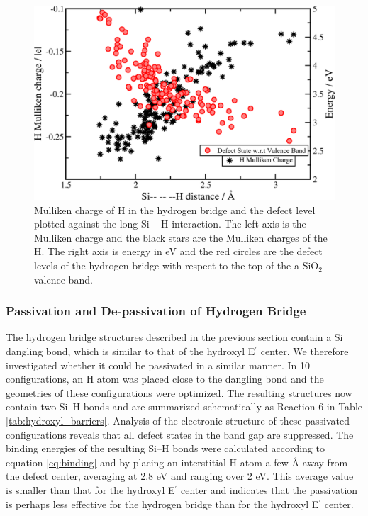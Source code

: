 \documentclass[aps,prb,reprint,superscriptaddress,showpacs]{revtex4-1}
\begin{document}
\begin{figure}[h!]
\includegraphics{hbridge_analysis.png}
\caption{Mulliken charge of H in the hydrogen bridge and the defect level plotted against the long \mbox{Si- -H} interaction. The left axis is the Mulliken charge and the black stars are the Mulliken charges of the H. The right axis is energy in eV and the red circles are the defect levels of the hydrogen bridge with respect to the top of the a-SiO$_2$ valence band.} 
\label{fig:hbridge_correlation}
\end{figure}


\subsubsection{Passivation and De-passivation of Hydrogen Bridge}

The hydrogen bridge structures described in the previous section contain a Si dangling bond, which is similar to that of the hydroxyl E$^\prime$ center. We therefore investigated whether it could be passivated in a similar manner. In 10 configurations, an H atom was placed close to the dangling bond and the geometries of these configurations were optimized. The resulting structures now contain two \mbox{Si--H} bonds and are summarized schematically as Reaction 6 in Table \ref{tab:hydroxyl_barriers}. Analysis of the electronic structure of these passivated configurations reveals that all defect states in the band gap are suppressed. The binding energies of the resulting \mbox{Si--H} bonds were calculated according to equation \ref{eq:binding} and by placing an interstitial H atom a few {\AA} away from the defect center, averaging at 2.8 eV and ranging over 2 eV. This average value is smaller than that for the hydroxyl E$^\prime$ center and indicates that the passivation is perhaps less effective for the hydrogen bridge than for the hydroxyl E$^\prime$ center. 
\end{document}
